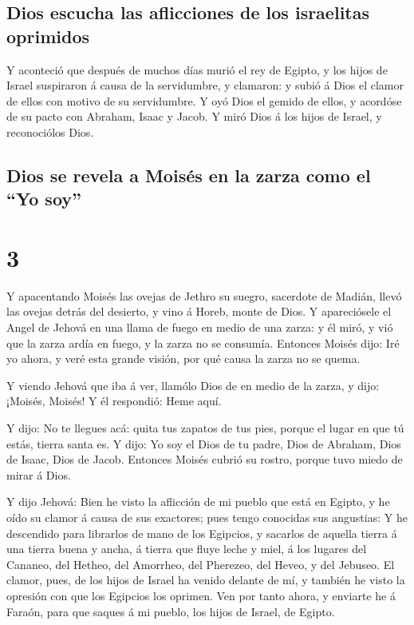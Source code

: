 \hypertarget{dios-escucha-las-aflicciones-de-los-israelitas-oprimidos}{%
\subsection{Dios escucha las aflicciones de los israelitas
oprimidos}\label{dios-escucha-las-aflicciones-de-los-israelitas-oprimidos}}

 Y aconteció que después de muchos días murió el rey de
Egipto, y los hijos de Israel suspiraron á causa de la servidumbre, y
clamaron: y subió á Dios el clamor de ellos con motivo de su
servidumbre.  Y oyó Dios el gemido de ellos, y acordóse de
su pacto con Abraham, Isaac y Jacob.  Y miró Dios á los
hijos de Israel, y reconociólos Dios.

\hypertarget{dios-se-revela-a-moisuxe9s-en-la-zarza-como-el-yo-soy}{%
\subsection{Dios se revela a Moisés en la zarza como el ``Yo
soy''}\label{dios-se-revela-a-moisuxe9s-en-la-zarza-como-el-yo-soy}}

\hypertarget{section-2}{%
\section{3}\label{section-2}}

 Y apacentando Moisés las ovejas de Jethro su suegro,
sacerdote de Madián, llevó las ovejas detrás del desierto, y vino á
Horeb, monte de Dios.  Y apareciósele el Angel de Jehová en
una llama de fuego en medio de una zarza: y él miró, y vió que la zarza
ardía en fuego, y la zarza no se consumía.  Entonces Moisés
dijo: Iré yo ahora, y veré esta grande visión, por qué causa la zarza no
se quema.

 Y viendo Jehová que iba á ver, llamólo Dios de en medio de
la zarza, y dijo: ¡Moisés, Moisés! Y él respondió: Heme aquí.

 Y dijo: No te llegues acá: quita tus zapatos de tus pies,
porque el lugar en que tú estás, tierra santa es.  Y dijo:
Yo soy el Dios de tu padre, Dios de Abraham, Dios de Isaac, Dios de
Jacob. Entonces Moisés cubrió su rostro, porque tuvo miedo de mirar á
Dios.

 Y dijo Jehová: Bien he visto la aflicción de mi pueblo que
está en Egipto, y he oído su clamor á causa de sus exactores; pues tengo
conocidas sus angustias:  Y he descendido para librarlos de
mano de los Egipcios, y sacarlos de aquella tierra á una tierra buena y
ancha, á tierra que fluye leche y miel, á los lugares del Cananeo, del
Hetheo, del Amorrheo, del Pherezeo, del Heveo, y del Jebuseo.
 El clamor, pues, de los hijos de Israel ha venido delante
de mí, y también he visto la opresión con que los Egipcios los oprimen.
 Ven por tanto ahora, y enviarte he á Faraón, para que
saques á mi pueblo, los hijos de Israel, de Egipto.

